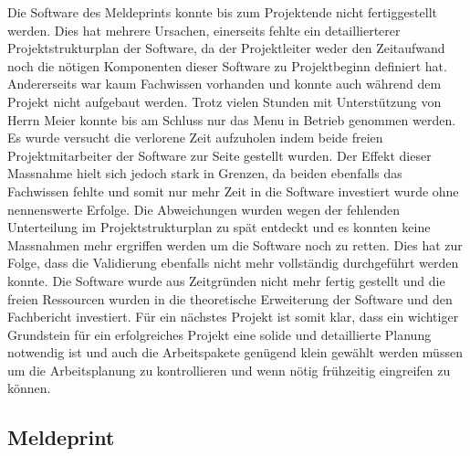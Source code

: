 Die Software des Meldeprints konnte bis zum Projektende nicht fertiggestellt werden. Dies hat mehrere Ursachen, einerseits fehlte ein detaillierterer Projektstrukturplan der Software, da der Projektleiter weder den Zeitaufwand noch die nötigen Komponenten dieser Software zu Projektbeginn definiert hat. Andererseits war kaum Fachwissen vorhanden und konnte auch während dem Projekt nicht aufgebaut werden. Trotz vielen Stunden mit Unterstützung von Herrn Meier konnte bis am Schluss nur das Menu in Betrieb genommen werden. \newline
Es wurde versucht die verlorene Zeit aufzuholen indem beide freien Projektmitarbeiter der Software zur Seite gestellt wurden. Der Effekt dieser Massnahme hielt sich jedoch stark in Grenzen, da beiden ebenfalls das Fachwissen fehlte und somit nur mehr Zeit in die Software investiert wurde ohne nennenswerte Erfolge. \newline
Die Abweichungen wurden wegen der fehlenden Unterteilung im Projektstrukturplan zu spät entdeckt und es konnten keine Massnahmen mehr ergriffen werden um die Software noch zu retten. Dies hat zur Folge, dass die Validierung ebenfalls nicht mehr vollständig durchgeführt werden konnte.  Die Software wurde aus Zeitgründen nicht mehr fertig gestellt und die freien Ressourcen wurden in die theoretische Erweiterung der Software und den Fachbericht investiert.\newline
Für ein nächstes Projekt ist somit klar, dass ein wichtiger Grundstein für ein erfolgreiches Projekt eine solide und detaillierte Planung notwendig ist und auch die Arbeitspakete genügend klein gewählt werden müssen um die Arbeitsplanung zu kontrollieren und wenn nötig frühzeitig eingreifen zu können.
\newpage 
\subsection{Meldeprint}

